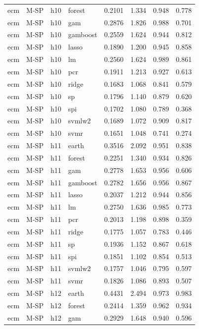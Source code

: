\begin{ThreePartTable}
\begin{longtable}[t]{llclcccc}
ecm & M-SP & h10 & forest & 0.2101 & 1.334 & 0.948 & 0.778\\
ecm & M-SP & h10 & gam & 0.2876 & 1.826 & 0.988 & 0.701\\
ecm & M-SP & h10 & gamboost & 0.2559 & 1.624 & 0.944 & 0.812\\
ecm & M-SP & h10 & lasso & 0.1890 & 1.200 & 0.945 & 0.858\\
ecm & M-SP & h10 & lm & 0.2560 & 1.624 & 0.989 & 0.861\\
ecm & M-SP & h10 & pcr & 0.1911 & 1.213 & 0.927 & 0.613\\
ecm & M-SP & h10 & ridge & 0.1683 & 1.068 & 0.841 & 0.579\\
ecm & M-SP & h10 & sp & 0.1796 & 1.140 & 0.879 & 0.620\\
ecm & M-SP & h10 & spi & 0.1702 & 1.080 & 0.789 & 0.368\\
ecm & M-SP & h10 & svmlw2 & 0.1689 & 1.072 & 0.909 & 0.817\\
ecm & M-SP & h10 & svmr & 0.1651 & 1.048 & 0.741 & 0.274\\
\addlinespace
ecm & M-SP & h11 & earth & 0.3516 & 2.092 & 0.951 & 0.838\\
ecm & M-SP & h11 & forest & 0.2251 & 1.340 & 0.934 & 0.826\\
ecm & M-SP & h11 & gam & 0.2778 & 1.653 & 0.956 & 0.606\\
ecm & M-SP & h11 & gamboost & 0.2782 & 1.656 & 0.956 & 0.867\\
ecm & M-SP & h11 & lasso & 0.2037 & 1.212 & 0.944 & 0.856\\
ecm & M-SP & h11 & lm & 0.2750 & 1.636 & 0.985 & 0.773\\
ecm & M-SP & h11 & pcr & 0.2013 & 1.198 & 0.898 & 0.359\\
ecm & M-SP & h11 & ridge & 0.1775 & 1.057 & 0.783 & 0.446\\
ecm & M-SP & h11 & sp & 0.1936 & 1.152 & 0.867 & 0.618\\
ecm & M-SP & h11 & spi & 0.1851 & 1.102 & 0.854 & 0.513\\
ecm & M-SP & h11 & svmlw2 & 0.1757 & 1.046 & 0.795 & 0.597\\
ecm & M-SP & h11 & svmr & 0.1826 & 1.086 & 0.893 & 0.507\\
\addlinespace
ecm & M-SP & h12 & earth & 0.4431 & 2.494 & 0.973 & 0.983\\
ecm & M-SP & h12 & forest & 0.2414 & 1.359 & 0.962 & 0.934\\
ecm & M-SP & h12 & gam & 0.2929 & 1.648 & 0.940 & 0.596\\

\end{longtable}
\end{ThreePartTable}
